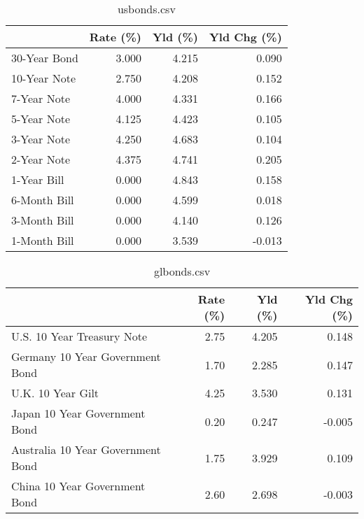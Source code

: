 \documentclass{article}%
\begin{document}
%


\begin{table}[htbp]%
\caption{usbonds.csv}%
\centering%
\begin{adjustbox}{width=1\textwidth}%
\begin{tabular}{lrrr}
\toprule
             &  Rate (\%) &  Yld (\%) &  Yld Chg (\%) \\
\midrule
30-Year Bond &     3.000 &    4.215 &        0.090 \\
10-Year Note &     2.750 &    4.208 &        0.152 \\
 7-Year Note &     4.000 &    4.331 &        0.166 \\
 5-Year Note &     4.125 &    4.423 &        0.105 \\
 3-Year Note &     4.250 &    4.683 &        0.104 \\
 2-Year Note &     4.375 &    4.741 &        0.205 \\
 1-Year Bill &     0.000 &    4.843 &        0.158 \\
6-Month Bill &     0.000 &    4.599 &        0.018 \\
3-Month Bill &     0.000 &    4.140 &        0.126 \\
1-Month Bill &     0.000 &    3.539 &       -0.013 \\
\bottomrule
\end{tabular}
%
\end{adjustbox}%
\end{table}

%


\begin{table}[htbp]%
\caption{glbonds.csv}%
\centering%
\begin{adjustbox}{width=1\textwidth}%
\begin{tabular}{lrrr}
\toprule
                                  &  Rate (\%) &  Yld (\%) &  Yld Chg (\%) \\
\midrule
       U.S. 10 Year Treasury Note &      2.75 &    4.205 &        0.148 \\
  Germany 10 Year Government Bond &      1.70 &    2.285 &        0.147 \\
                U.K. 10 Year Gilt &      4.25 &    3.530 &        0.131 \\
    Japan 10 Year Government Bond &      0.20 &    0.247 &       -0.005 \\
Australia 10 Year Government Bond &      1.75 &    3.929 &        0.109 \\
    China 10 Year Government Bond &      2.60 &    2.698 &       -0.003 \\
\bottomrule
\end{tabular}
%
\end{adjustbox}%
\end{table}
\end{document}
